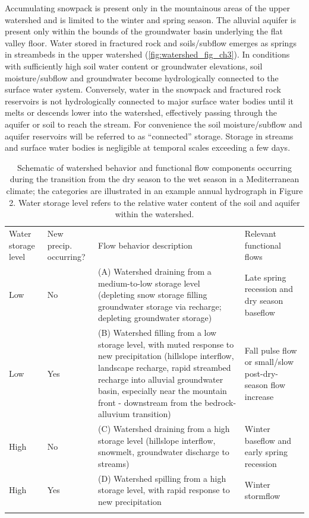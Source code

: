 \documentclass[hess, manuscript]{copernicus}
\begin{document}
Accumulating snowpack is present only in the mountainous areas of the
upper watershed and is limited to the winter and spring season. The
alluvial aquifer is present only within the bounds of the groundwater
basin underlying the flat valley floor. Water stored in fractured rock
and soils/subflow emerges as springs in streambeds in the upper
watershed \citep{Mack1958} (\autoref{fig:watershed_fig_ch3}). In
conditions with sufficiently high soil water content or groundwater
elevations, soil moisture/subflow and groundwater become hydrologically
connected to the surface water system. Conversely, water in the snowpack
and fractured rock reservoirs is not hydrologically connected to major
surface water bodies until it melts or descends lower into the
watershed, effectively passing through the aquifer or soil to reach the
stream. For convenience the soil moisture/subflow and aquifer reservoirs
will be referred to as ``connected'' storage. Storage in streams and
surface water bodies is negligible at temporal scales exceeding a few
days.

\begin{table}[t]
\caption{Schematic of watershed behavior and functional flow components occurring during the transition from the dry season to the wet season in a Mediterranean climate; the categories are illustrated in an example annual hydrograph in Figure 2. Water storage level refers to the relative water content of the soil and aquifer within the watershed.}
\label{tab:watershed_modes_tab}
\begin{tabular}{p{1.8cm} p{1.6cm} p{6.0cm} p{3.8cm}}
\tophline
Water storage level & New precip. occurring? & Flow behavior description & Relevant functional flows \\
\middlehline
 Low & No & (A) Watershed draining from a medium-to-low storage level (depleting snow storage filling groundwater storage via recharge; depleting groundwater storage) & Late spring recession and dry season baseflow \\ 
 \middlehline
Low & Yes & (B) Watershed filling from a low storage level, with muted response to new precipitation (hillslope interflow, landscape recharge, rapid streambed recharge into alluvial groundwater basin, especially near the mountain front - downstream from the bedrock-alluvium transition) & Fall pulse flow or small/slow post-dry-season flow increase \\
\middlehline
High & No & (C) Watershed draining from a high storage level (hillslope interflow, snowmelt, groundwater discharge to streams) & Winter baseflow and early spring recession \\
\middlehline
High & Yes & (D) Watershed spilling from a high storage level, with rapid response to new precipitation & Winter stormflow\\
\bottomhline
\end{tabular}
\belowtable{}
\end{table}
\end{document}
